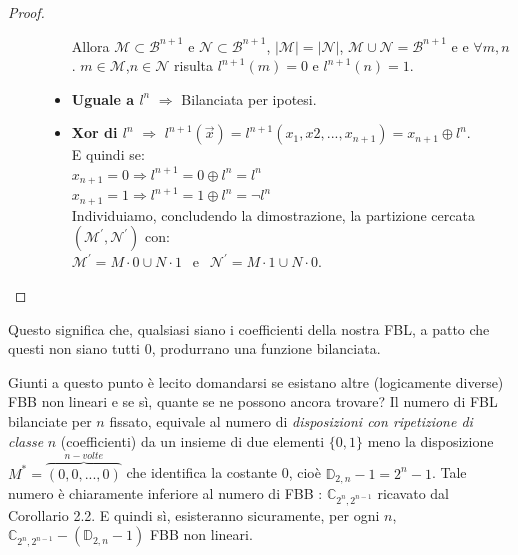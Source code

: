 \documentclass[12pt,a4paper,openright]{report}
\newcommand*\xor{\mathbin{\oplus}}
\begin{document}
\begin{proof}
\begin{description}
\begin{itemize}
                                                              Allora $\mathcal{M}\subset\mathcal{B}^{n+1}$ e $\mathcal{N}\subset\mathcal{B}^{n+1}$, ${\left\vert{\mathcal{M}}\right\vert} = {\left\vert{\mathcal{N}}\right\vert}$, $\mathcal{M} \cup \mathcal{N} = \mathcal{B}^{n+1}$ e
                                                              e $\forall m,n$. $m\in\mathcal{M}$,$n \in\mathcal{N}$ risulta $l^{n+1}(m) = 0$ e $ l^{n+1}(n) = 1$.
                                    \item \textbf{Uguale a $l^n$} $\Rightarrow$ Bilanciata per ipotesi. 
                                    \item \textbf{Xor di $l^n$} $\Rightarrow$ $l^{n+1}(\vec{x}) = l^{n+1}(x_1,x2,...,x_{n+1})= x_{n+1} \xor l^n$.
                                    \\ E quindi se:\\
                                    $x_{n+1} = 0 \Rightarrow l^{n+1} = 0 \xor l^n = l^n$ \\
                                    $x_{n+1} = 1 \Rightarrow l^{n+1} = 1 \xor l^n = \neg l^n$\\
                                    Individuiamo, concludendo la dimostrazione, la partizione cercata $(\mathcal{M^\prime},\mathcal{N^\prime})$ con:\\
                                    $\mathcal{M^\prime} = M\cdot0 \cup N\cdot1 \:\:$  e  $\:\: \mathcal{N^\prime} = M\cdot1 \cup N\cdot0$.
                                \end{itemize}
    \end{description}
\end{proof}
\noindent Questo significa che, qualsiasi siano i coefficienti della nostra FBL, a patto che questi non siano tutti $0$, produrrano una funzione bilanciata.\par

Giunti a questo punto è lecito domandarsi se esistano altre (logicamente diverse) FBB  non lineari e se sì, quante se ne possono ancora trovare?
Il numero di FBL bilanciate per $n$ fissato, equivale al numero di \textit{disposizioni con ripetizione di classe} $n$ (coefficienti) da un insieme di due elementi $\{0,1\}$ meno la disposizione $M^*=\overbrace{(0,0,...,0)}^{n-volte}$ che identifica la costante 0, cioè $\mathbb{D}_{2,n}-1= 2^n - 1$.
Tale numero è chiaramente inferiore al numero di FBB : $\mathbb{C}_{2^n,2^{n-1}}$ ricavato dal Corollario 2.2. E quindi sì, esisteranno sicuramente, per ogni $n$, $\mathbb{C}_{2^n,2^{n-1}} - (\mathbb{D}_{2,n} - 1)$ FBB non lineari.
\end{document}
